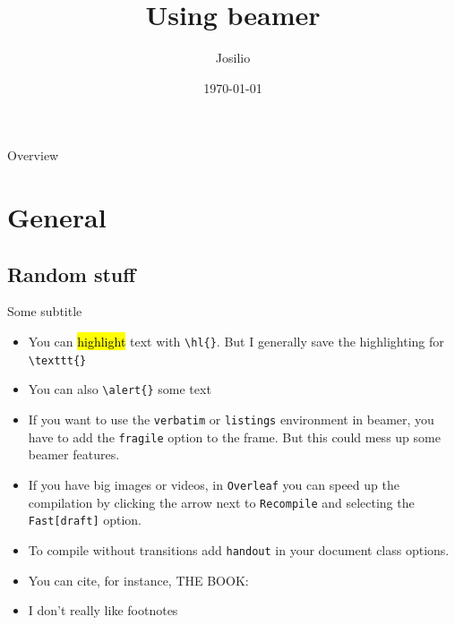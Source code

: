 \documentclass[aspectratio=169,11pt]{beamer}
\title[beamer stuff]{Using beamer}
\author{Josilio}
\date{\today}
\institute{KTH Mechanics}
\begin{document}
\startpage
\begin{frame}[noframenumbering]

  \maketitle

\end{frame}


\normalpageline


\begin{frame}{Overview}
\tableofcontents
\end{frame}

\section{General}
\subsection{Random stuff}
\begin{frame}[fragile]{\insertsection}{Some subtitle}
    \begin{itemize}
    \item You can \hl{highlight} text with \verb|\hl{}|. But I generally save the highlighting for \verb|\texttt{}|
    \item You can also \verb|\alert{}| some \alert{text}
    \item If you want to use the \texttt{verbatim} or \texttt{listings} environment in beamer, you have to add the \texttt{fragile} option to the frame. But this could mess up some beamer features.
    \item If you have big images or videos, in \texttt{Overleaf} you can speed up the compilation by clicking the arrow next to \texttt{Recompile} and selecting the \texttt{Fast[draft]} option. 
    \item To compile without transitions add \texttt{handout} in your document class options.
    \item You can cite, for instance, THE BOOK: \cite{schmid2002stability}

    \item I don't really like footnotes\footnotemark[1]
    
    \end{itemize}
\end{frame}
\end{document}
